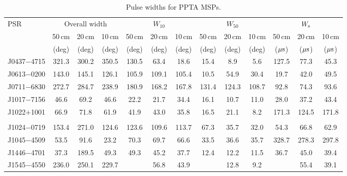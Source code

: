 \documentclass[useAMS,usenatbib]{mn2e}
\begin{document}
\begin{table}
\begin{center}
\caption{Pulse widths for PPTA MSPs.}
\label{tableWidth}
\begin{tabular}{lcccccccccccc}
\hline
PSR              & \multicolumn{3}{c}{Overall width}   &               &   $W_{10}$       &                  &      &      $W_{50}$       &            &                       &  $W_{\rm{s}}$    &      \\
								 &  50\,cm & 20\,cm & 10\,cm  &  50\,cm      &    20\,cm    &    10\,cm      &  50\,cm   &   20\,cm      &   10\,cm     &  50\,cm     &     20\,cm      &    10\,cm       \\
								 &  (deg) &  (deg) & (deg)  &    (deg)   &         (deg)          &     (deg)   &   (deg)   &         (deg)          &     (deg)  &   ($\rm{\mu s}$)   &         ($\rm{\mu s}$)          &     ($\rm{\mu s}$)  \\
\hline
J0437$-$4715     & 321.3 &  300.2 &  350.5  &  130.5     & 63.4   & 18.6   & 15.4  & 8.9   & 5.6     &  127.5  &  77.3  & 45.3   \\
J0613$-$0200     & 143.0 &  145.1 &  126.1  &  105.9     & 109.1  & 105.4  & 10.5  & 54.9  & 30.4    &  19.7   &  42.0  & 49.5    \\
J0711$-$6830     & 272.7 &  284.7 &  238.9  &  180.9     & 168.2  & 167.8  & 131.4  & 124.3  & 108.7 &  92.8   &  74.3  & 93.6       \\
J1017$-$7156     & 46.6  &  69.2  &  46.6   &  22.2      & 21.7   & 34.4   & 16.1  & 10.7  & 11.0    &  28.0   &  37.2  & 43.4    \\
J1022$+$1001     & 66.9  &  71.8  &  61.9   &  41.9      & 43.0   & 35.8   & 16.5  & 21.1  & 8.2     &  171.3  &  124.5 & 171.8  \\
	               &       &        &         &            &   &   &   &   &              \\                                                
J1024$-$0719     & 153.4 &  271.0 &  124.6  &  123.6     & 109.6  & 113.7  & 67.3  & 35.7  & 32.0    &  54.3   &  66.8  & 62.9       \\
J1045$-$4509     & 53.5  &  91.6  &  23.2   &  70.3      & 69.7   & 66.6   & 33.5  & 36.6  & 35.7    &  328.7  &  278.3 & 297.8      \\
J1446$-$4701     & 37.3  &  189.5 &  49.3   &  49.3      & 45.2   & 37.7   & 12.4  & 12.2  & 11.5    &  36.7   &  45.0  & 39.4  \\
J1545$-$4550     & 236.0 &  250.1 &  229.7  &            & 56.8   & 43.9   &       & 12.8  & 9.2     &         &  55.4  & 39.1  \\

\end{tabular}
\end{center}
\end{table}
\end{document}
